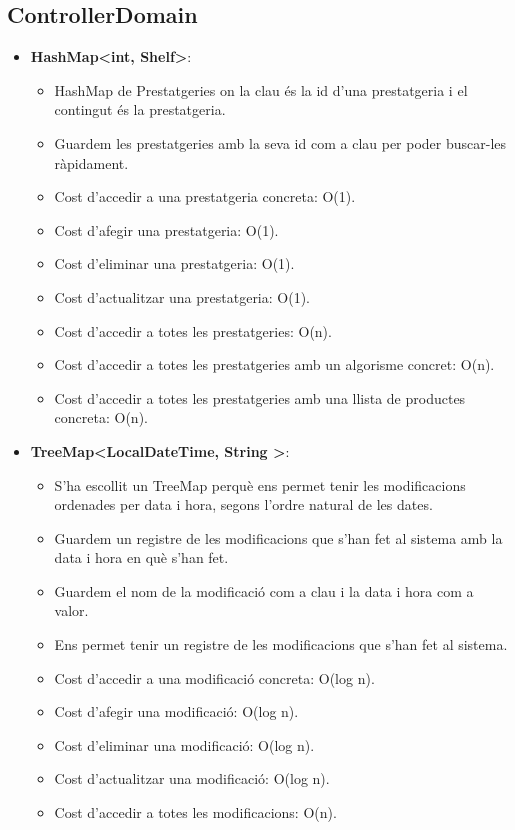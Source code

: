 \documentclass[a4paper, t]{article}
\begin{document}
\subsection{ControllerDomain}
\begin{itemize}
    \item \textbf{HashMap\textless int, Shelf\textgreater}: 
    \begin{itemize}
        \item HashMap de Prestatgeries on la clau és la id d’una prestatgeria i el contingut és la prestatgeria.
        \item Guardem les prestatgeries amb la seva id com a clau per poder buscar-les ràpidament.
        \item Cost d’accedir a una prestatgeria concreta: O(1).
        \item Cost d’afegir una prestatgeria: O(1).
        \item Cost d’eliminar una prestatgeria: O(1).
        \item Cost d’actualitzar una prestatgeria: O(1).
        \item Cost d’accedir a totes les prestatgeries: O(n).
        \item Cost d’accedir a totes les prestatgeries amb un algorisme concret: O(n).
        \item Cost d’accedir a totes les prestatgeries amb una llista de productes concreta: O(n).
    \end{itemize}

    \item \textbf{TreeMap\textless LocalDateTime, String \textgreater}:
    \begin{itemize}
        \item S'ha escollit un TreeMap perquè ens permet tenir les modificacions ordenades per data i hora, segons l'ordre natural de les dates.
        \item Guardem un registre de les modificacions que s’han fet al sistema amb la data i hora en què s’han fet.
        \item Guardem el nom de la modificació com a clau i la data i hora com a valor.
        \item Ens permet tenir un registre de les modificacions que s’han fet al sistema.
        \item Cost d’accedir a una modificació concreta: O(log n).
        \item Cost d’afegir una modificació: O(log n).
        \item Cost d’eliminar una modificació: O(log n).
        \item Cost d’actualitzar una modificació: O(log n).
        \item Cost d’accedir a totes les modificacions: O(n).
    \end{itemize}
\end{itemize}
\end{document}
